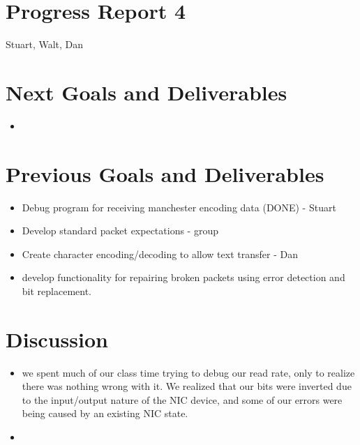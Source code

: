 \documentclass{article}
\begin{document}
\section*{Progress Report 4}
Stuart, Walt, Dan

\section*{Next Goals and Deliverables}
\begin{itemize}
\item 
\end{itemize}

\section*{Previous Goals and Deliverables}
\begin{itemize}
    \item Debug program for receiving manchester encoding data (DONE) - Stuart
    \item Develop standard packet expectations - group
    \item Create character encoding/decoding to allow text transfer - Dan
    \item develop functionality for repairing broken packets using error detection and bit replacement.
\end{itemize}

\section*{Discussion}
\begin{itemize}
\item we spent much of our class time trying to debug our read rate, only to realize there was nothing wrong with it. We realized
that our bits were inverted due to the input/output nature of the NIC device, and some of our errors were being caused by an existing NIC state.
\item 
\end{itemize}

\end{document}
